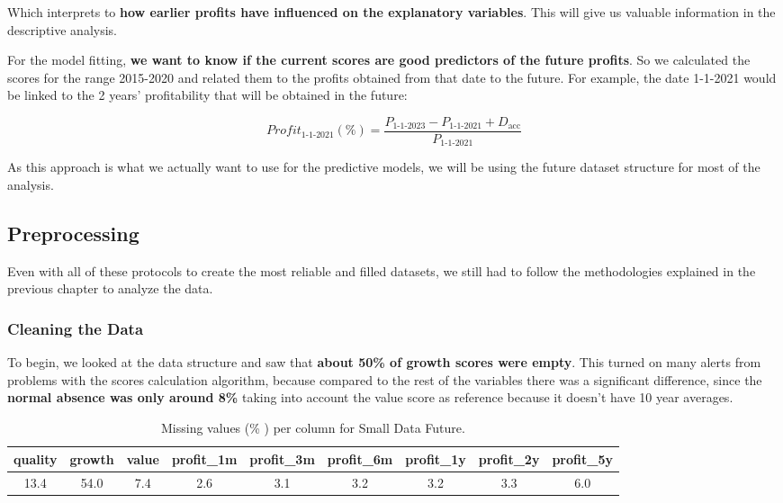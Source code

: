 \documentclass[11pt,english,a4paper,hidelinks]{book}
\begin{document}
\noindent Which interprets to \textbf{how earlier profits have influenced on the explanatory variables}. This will give us valuable information in the descriptive analysis.

\vspace{0.5cm}
\noindent For the model fitting, \textbf{we want to know if the current scores are good predictors of the future profits}. So we calculated the scores for the range 2015-2020 and related them to the profits obtained from that date to the future. For example, the date 1-1-2021 would be linked to the 2 years' profitability that will be obtained in the future: 

\begin{equation}
    Profit_{1\text{-}1\text{-}2021}(\%) = \frac{P_{1\text{-}1\text{-}2023} - P_{1\text{-}1\text{-}2021} + D_{\text{acc}}}{P_{1\text{-}1\text{-}2021}}
\end{equation}

\noindent As this approach is what we actually want to use for the predictive models, we will be using the future dataset structure for most of the analysis.

\subsection{Preprocessing}
Even with all of these protocols to create the most reliable and filled datasets, we still had to follow the methodologies explained in the previous chapter to analyze the data.

\subsubsection{Cleaning the Data}
To begin, we looked at the data structure and saw that \textbf{about 50\% of growth scores were empty}. This turned on many alerts from problems with the scores calculation algorithm, because compared to the rest of the variables there was a significant difference, since the \textbf{normal absence was only around 8\%} taking into account the value score as reference because it doesn't have 10 year averages.
\begin{table}[H]
    \centering
    \begin{tabular}{|c|c|c|c|c|c|c|c|c|}
        \hline
        \textbf{quality} & \textbf{growth} & \textbf{value} & \textbf{profit\_1m} & \textbf{profit\_3m} & \textbf{profit\_6m} & \textbf{profit\_1y} & \textbf{profit\_2y} & \textbf{profit\_5y} \\
        \hline
        13.4 & 54.0 & 7.4 & 2.6 & 3.1 & 3.2 & 3.2 & 3.3 & 6.0 \\
        \hline
    \end{tabular}
    \caption{Missing values (\% ) per column for Small Data Future.}
    \label{tab:missing_values_small_data_future}
\end{table}
\end{document}

